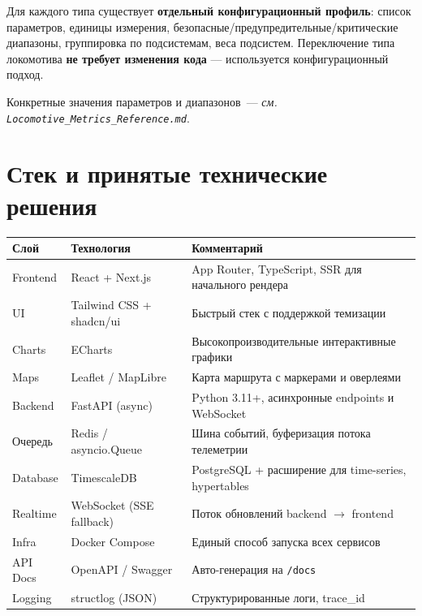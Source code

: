 \documentclass[12pt,a4paper]{article}
\newcommand{\code}[1]{\texttt{#1}}
\begin{document}
\vspace{0.5em}
Для каждого типа существует \textbf{отдельный конфигурационный профиль}: список параметров, единицы измерения, безопасные/предупредительные/критические диапазоны, группировка по подсистемам, веса подсистем. Переключение типа локомотива \textbf{не требует изменения кода} --- используется конфигурационный подход.

Конкретные значения параметров и диапазонов~--- \textit{см.\,\code{Locomotive\_Metrics\_Reference.md}}.


\section{Стек и принятые технические решения}

\begin{tabularx}{\textwidth}{l l X}
\toprule
\textbf{Слой} & \textbf{Технология} & \textbf{Комментарий} \\
\midrule
Frontend & React + Next.js & App Router, TypeScript, SSR для начального рендера \\
UI & Tailwind CSS + shadcn/ui & Быстрый стек с поддержкой темизации \\
Charts & ECharts & Высокопроизводительные интерактивные графики \\
Maps & Leaflet / MapLibre & Карта маршрута с маркерами и оверлеями \\
Backend & FastAPI (async) & Python 3.11+, асинхронные endpoints и WebSocket \\
Очередь & Redis / asyncio.Queue & Шина событий, буферизация потока телеметрии \\
Database & TimescaleDB & PostgreSQL + расширение для time-series, hypertables \\
Realtime & WebSocket (SSE fallback) & Поток обновлений backend $\to$ frontend \\
Infra & Docker Compose & Единый способ запуска всех сервисов \\
API Docs & OpenAPI / Swagger & Авто-генерация на \code{/docs} \\
Logging & structlog (JSON) & Структурированные логи, trace\_id \\
\bottomrule
\end{tabularx}


\end{document}

